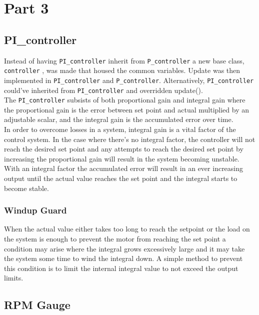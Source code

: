 \documentclass{article}
\begin{document}
\section{Part 3}

\subsection{PI\_controller}
Instead of having \verb!PI_controller! inherit from \verb!P_controller! a new base class, \verb!controller! , was made that housed the common variables. Update was then implemented in \verb!PI_controller! and \verb!P_controller!. Alternatively, \verb!PI_controller! could've inherited from \verb!PI_controller! and overridden update().
\\
The \verb!PI_controller! subsists of both proportional gain and integral gain where the proportional gain is the error between set point and actual multiplied by an adjustable scalar, and the integral gain is the accumulated error over time.
\\
In order to overcome losses in a system, integral gain is a vital factor of the control system. In the case where there's no integral factor, the controller will not reach the desired set point and any attempts to reach the desired set point by increasing the proportional gain will result in the system becoming unstable.
\\
With an integral factor the accumulated error will result in an ever increasing output until the actual value reaches the set point and the integral starts to become stable.

\subsubsection{Windup Guard}

When the actual value either takes too long to reach the setpoint or the load on the system is enough to prevent the motor from reaching the set point a condition may arise where the integral grows excessively large and it may take the system some time to wind the integral down. A simple method  to prevent this condition is to limit the internal integral value to not exceed the output limits.

\subsection{RPM Gauge}
\end{document}
